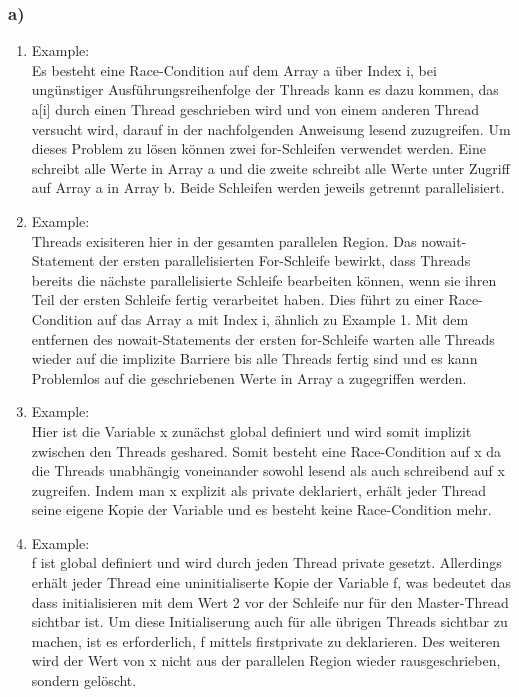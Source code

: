 \documentclass{report}
\begin{document}
    	\subsubsection{a)}
		\begin{enumerate}
			\item Example: \\
				Es besteht eine Race-Condition auf dem Array a über Index i,
				bei ungünstiger Ausführungsreihenfolge der Threads kann es dazu kommen,
				das a[i] durch einen Thread geschrieben wird und von einem anderen Thread versucht wird, darauf in der nachfolgenden Anweisung lesend zuzugreifen.
				Um dieses Problem zu lösen können zwei for-Schleifen verwendet werden.
				Eine schreibt alle Werte in Array a und die zweite schreibt alle Werte unter Zugriff auf Array a in Array b. 
				Beide Schleifen werden jeweils getrennt parallelisiert.
			\item Example: \\
				Threads exisiteren hier in der gesamten parallelen Region.
				Das nowait-Statement der ersten parallelisierten For-Schleife bewirkt, dass Threads bereits die nächste parallelisierte Schleife bearbeiten können, wenn sie ihren Teil der ersten Schleife fertig verarbeitet haben.
				Dies führt zu einer Race-Condition auf das Array a mit Index i, ähnlich zu Example 1.
				Mit dem entfernen des nowait-Statements der ersten for-Schleife warten alle Threads wieder auf die implizite Barriere bis alle Threads fertig sind und es kann Problemlos auf die geschriebenen Werte in Array a zugegriffen werden.
			\item Example: \\
				Hier ist die Variable x zunächst global definiert und wird somit implizit zwischen den Threads geshared. 
				Somit besteht eine Race-Condition auf x da die Threads unabhängig voneinander sowohl lesend als auch schreibend auf x zugreifen.
				Indem man x explizit als private deklariert, erhält jeder Thread seine eigene Kopie der Variable und es besteht keine Race-Condition mehr.
			\item Example: \\
				f ist global definiert und wird durch jeden Thread private gesetzt. 
				Allerdings erhält jeder Thread eine uninitialiserte Kopie der Variable f, was bedeutet das dass initialisieren mit dem Wert 2 vor der Schleife nur für den Master-Thread sichtbar ist.
				Um diese Initialiserung auch für alle übrigen Threads sichtbar zu machen, ist es erforderlich, f mittels firstprivate zu deklarieren.
				Des weiteren wird der Wert von x nicht aus der parallelen Region wieder rausgeschrieben, sondern gelöscht. 

\end{enumerate}
\end{document}
